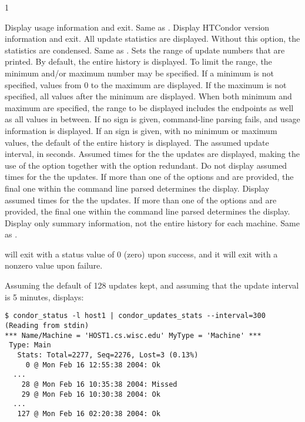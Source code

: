 \begin{ManPage}{\label{man-condor-updates-stats}}{1}
\begin{Options}
    {Display usage information and exit. }
    {Same as .  }
    {Display HTCondor version information and exit. }
    {All update statistics are displayed.
    Without this option, the statistics are condensed.}
    {Same as .  }
   {Sets the
    range of update numbers that
    are printed.  By default, the entire history is displayed.
    To limit the range, the minimum and/or maximum
    number may be specified.
    If a minimum is not specified, values from 0 to the maximum
    are displayed.
    If the maximum is not specified, all values after the minimum
    are displayed.
    When both minimum and maximum are specified, the range
    to be displayed includes the endpoints as well as all
    values in between.
    If no \eq{} sign is given, command-line parsing fails,
    and usage information is displayed.
    If an  \eq{} sign is given, with no minimum or maximum values,
    the default of the entire history is displayed.}
   {The assumed update
    interval, in seconds.
    Assumed times for the the updates are displayed, making the
    use of the  option together with 
    the  option redundant.}
   {Do not display assumed times for the
    the updates.
    If more than one of the options  and 
    are provided, the final one within the command line parsed
    determines the display.  }
   {Display assumed times for the the updates.
    If more than one of the options  and 
    are provided, the final one within the command line parsed
    determines the display.  }
   {Display only summary
    information, not the entire history for each machine.  }
    {Same as .  }
\end{Options}

\ExitStatus

 will exit with a status value of 0 (zero) upon success,
and it will exit with a nonzero value upon failure.

\Examples
Assuming the default of 128 updates kept, 
and assuming that the update interval is 5 minutes,
 displays: 
\footnotesize
\begin{verbatim}
$ condor_status -l host1 | condor_updates_stats --interval=300
(Reading from stdin)
*** Name/Machine = 'HOST1.cs.wisc.edu' MyType = 'Machine' ***
 Type: Main
   Stats: Total=2277, Seq=2276, Lost=3 (0.13%)
     0 @ Mon Feb 16 12:55:38 2004: Ok
  ...
    28 @ Mon Feb 16 10:35:38 2004: Missed
    29 @ Mon Feb 16 10:30:38 2004: Ok
  ...
   127 @ Mon Feb 16 02:20:38 2004: Ok
\end{verbatim}
\normalsize


\end{ManPage}

